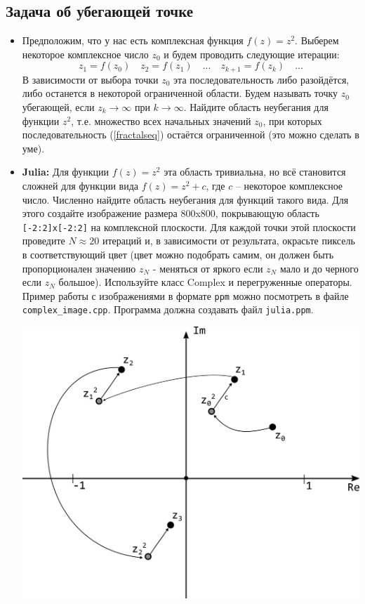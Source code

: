 \documentclass{article}
\begin{document}
\subsection*{Задача об убегающей точке}
\begin{itemize}
\item Предположим, что у нас есть комплексная функция $f(z) = z^2$. Выберем некоторое комплексное число $z_0$ и будем проводить следующие итерации: 
\begin{equation}
\label{fractalseq}
z_1 = f(z_0)\quad z_2 = f(z_1)\quad ...\quad z_{k+1} = f(z_k)\quad ...
\end{equation}
В зависимости от выбора точки $z_0$ эта последовательность либо разойдётся, либо останется в некоторой ограниченной области. Будем называть точку $z_0$ убегающей, если $z_k \rightarrow \infty$ при $k \rightarrow \infty$. Найдите область неубегания для функции $z^2$, т.е. множество всех начальных значений $z_0$, при которых последовательность (\ref{fractalseq}) остаётся ограниченной (это можно сделать в уме). \\

\item \textbf{Julia:} Для функции $f(z) = z^2$ эта область тривиальна, но всё становится сложней для функции вида $f(z) = z^2 + c$, где $c$ -- некоторое комплексное число. Численно найдите область неубегания для функций такого вида. Для этого создайте изображение размера 800x800, покрывающую область \texttt{[-2:2]x[-2:2]} на комплексной плоскости. Для каждой точки этой плоскости проведите $N \approx 20$ итераций и, в зависимости от результата, окрасьте пиксель в соответствующий цвет (цвет можно подобрать самим, он должен быть пропорционален значению $z_N$ - меняться от яркого если $z_N$ мало и до черного если $z_N$ большое). Используйте класс Complex и перегруженные операторы. Пример работы с изображениями в формате \texttt{ppm} можно посмотреть в файле \texttt{complex\_image.cpp}. Программа должна создавать файл \texttt{julia.ppm}.

\begin{center}
\includegraphics[scale=0.7]{../images/complexplane.png}
\end{center}


\end{itemize}
\end{document}
